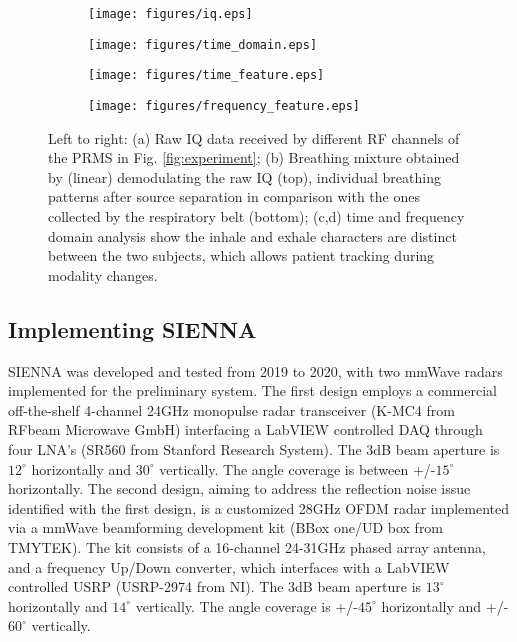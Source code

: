 \begin{figure*}[t]
\begin{subfigure}[t]{0.24\textwidth}
\texttt{[image: figures/iq.eps]}
\end{subfigure}
\hspace{\fill}
\begin{subfigure}[t]{0.24\textwidth}
\texttt{[image: figures/time\_domain.eps]}
\end{subfigure}
\hspace{\fill}
\begin{subfigure}[t]{0.24\textwidth}
\texttt{[image: figures/time\_feature.eps]}
\end{subfigure}
\hspace{\fill}
\begin{subfigure}[t]{0.24\textwidth}
\texttt{[image: figures/frequency\_feature.eps]}
\end{subfigure}

\caption{Left to right: (a) Raw IQ data received by different RF channels of the PRMS in Fig. \ref{fig:experiment}; (b) Breathing mixture obtained by (linear) demodulating the raw IQ (top), individual breathing patterns after source separation in comparison with the ones collected by the respiratory belt (bottom); (c,d) time and frequency domain analysis show the inhale and exhale characters are distinct between the two subjects, which allows patient tracking during modality changes.}
\label{fig:breathing separation}
\end{figure*}

\subsection{Implementing SIENNA}
SIENNA was developed and tested from 2019 to 2020, with two mmWave radars implemented for the preliminary system. The first design employs a commercial off-the-shelf 4-channel 24GHz monopulse radar transceiver (K-MC4 from RFbeam Microwave GmbH) interfacing a LabVIEW controlled DAQ through four LNA's (SR560 from Stanford Research System). The 3dB beam aperture is $12^{\circ}$ horizontally and $30^{\circ}$ vertically. The angle coverage is between +/-$15^{\circ}$ horizontally. The second design, aiming to address the reflection noise issue identified with the first design, is a customized 28GHz OFDM radar implemented via a mmWave beamforming development kit (BBox one/UD box from TMYTEK). The kit consists of a 16-channel 24-31GHz phased array antenna, and a frequency Up/Down converter, which interfaces with a LabVIEW controlled USRP (USRP-2974 from NI). The 3dB beam aperture is $13^{\circ}$ horizontally and $14^{\circ}$ vertically. The angle coverage is +/-$45^{\circ}$ horizontally and +/-$60^{\circ}$ vertically. 

